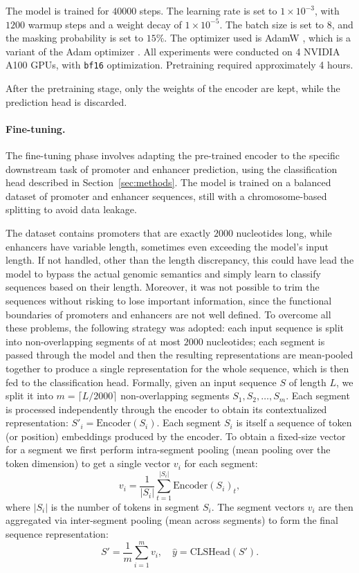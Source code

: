 \documentclass[11pt,a4paper,twoside]{article}
\begin{document}
The model is trained for $40000$ steps. 
The learning rate is set to $1 \times 10^{-3}$, with $1200$ warmup steps and a weight decay of $1 \times 10^{-5}$. 
The batch size is set to $8$, and the masking probability is set to $15\%$.
The optimizer used is AdamW \cite{adamw}, which is a variant of the Adam optimizer \cite{adam}. All experiments were conducted on 4 NVIDIA A100 GPUs, with \texttt{bf16} optimization. Pretraining required approximately 4 hours.

After the pretraining stage, only the weights of the encoder are kept, while the prediction head is discarded.

\paragraph{Fine-tuning.}
The fine-tuning phase involves adapting the pre-trained encoder to the specific downstream task of promoter and enhancer prediction, using the classification head described in Section~\ref{sec:methods}.
The model is trained on a balanced dataset of promoter and enhancer sequences, still with a chromosome-based splitting to avoid data leakage.

The dataset contains promoters that are exactly $2000$ nucleotides long, while enhancers have variable length, sometimes even exceeding the model's input length. 
If not handled, other than the length discrepancy, this could have lead the model to bypass the actual genomic semantics and simply learn to classify sequences based on their length. 
Moreover, it was not possible to trim the sequences without risking to lose important information, since the functional boundaries of promoters and enhancers are not well defined.
To overcome all these problems, the following strategy was adopted: each input sequence is split into non-overlapping segments of at most $2000$ nucleotides; each segment is passed through the model and then the resulting representations are mean-pooled together to produce a single representation for the whole sequence, which is then fed to the classification head.
Formally, given an input sequence $S$ of length $L$, we split it into $m = \lceil L / 2000 \rceil$ non-overlapping segments $S_1, S_2, \dots, S_m$. 
Each segment is processed independently through the encoder to obtain its contextualized representation: $S'_i = \text{Encoder}(S_i)$.
Each segment $S_i$ is itself a sequence of token (or position) embeddings produced by the encoder. To obtain a fixed-size vector for a segment we first perform intra-segment pooling (mean pooling over the token dimension) to get a single vector $v_i$ for each segment:
$$
v_i = \frac{1}{|S_i|} \sum_{t=1}^{|S_i|} \text{Encoder}(S_i)_t,
$$
where $|S_i|$ is the number of tokens in segment $S_i$. The segment vectors $v_i$ are then aggregated via inter-segment pooling (mean across segments) to form the final sequence representation:
$$
S' = \frac{1}{m} \sum_{i=1}^{m} v_i,\quad \hat{y} = \text{CLSHead}(S').
$$
\end{document}
